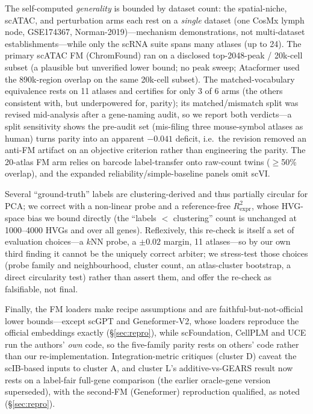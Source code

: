 \documentclass[11pt]{article}
\begin{document}
The self-computed \emph{generality} is bounded by dataset count: the spatial-niche, scATAC, and perturbation arms each rest on a \emph{single} dataset (one CosMx lymph node, GSE174367, Norman-2019)---mechanism demonstrations, not multi-dataset establishments---while only the scRNA suite spans many atlases (up to 24). The primary scATAC FM (ChromFound) ran on a disclosed top-2048-peak / 20k-cell subset (a plausible but unverified lower bound; no peak sweep; Atacformer used the 890k-region overlap on the same 20k-cell subset). The matched-vocabulary equivalence rests on 11 atlases and certifies for only 3 of 6 arms (the others consistent with, but underpowered for, parity); its matched/mismatch split was revised mid-analysis after a gene-naming audit, so we report both verdicts---a split sensitivity shows the pre-audit set (mis-filing three mouse-symbol atlases as human) turns parity into an apparent $-0.041$ deficit, i.e.\ the revision removed an anti-FM artifact on an objective criterion rather than engineering the parity. The 20-atlas FM arm relies on barcode label-transfer onto raw-count twins ($\geq$50\% overlap), and the expanded reliability/simple-baseline panels omit scVI.

Several ``ground-truth'' labels are clustering-derived and thus partially circular for PCA; we correct with a non-linear probe and a reference-free $R^2_{\mathrm{expr}}$, whose HVG-space bias we bound directly (the ``labels $<$ clustering'' count is unchanged at 1000--4000 HVGs and over all genes). Reflexively, this re-check is itself a set of evaluation choices---a $k$NN probe, a $\pm0.02$ margin, 11 atlases---so by our own third finding it cannot be the uniquely correct arbiter; we stress-test those choices (probe family and neighbourhood, cluster count, an atlas-cluster bootstrap, a direct circularity test) rather than assert them, and offer the re-check as falsifiable, not final.

Finally, the FM loaders make recipe assumptions and are faithful-but-not-official lower bounds---except scGPT and Geneformer-V2, whose loaders reproduce the official embeddings exactly (\S\ref{sec:repro}), while scFoundation, CellPLM and UCE run the authors' \emph{own} code, so the five-family parity rests on others' code rather than our re-implementation. Integration-metric critiques (cluster D) caveat the scIB-based inputs to cluster A, and cluster L's additive-vs-GEARS result now rests on a label-fair full-gene comparison (the earlier oracle-gene version superseded), with the second-FM (Geneformer) reproduction qualified, as noted (\S\ref{sec:repro}).
\end{document}
